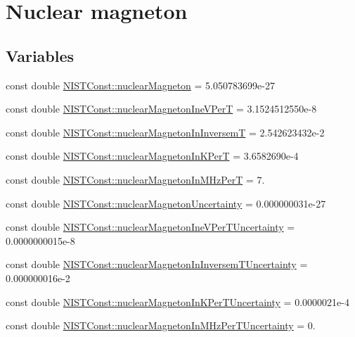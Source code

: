 \hypertarget{group___nuclear_magneton}{}\section{Nuclear magneton}
\label{group___nuclear_magneton}
\subsection*{Variables}
\begin{DoxyCompactItemize}
\item 
const double \hyperlink{group___nuclear_magneton_gacf9b0d2a2517113d30300e4ed7b56cc7}{N\+I\+S\+T\+Const\+::nuclear\+Magneton} = 5.\+050783699e-\/27
\item 
const double \hyperlink{group___nuclear_magneton_ga5a31a1865923a1c14cd7f22c8973186e}{N\+I\+S\+T\+Const\+::nuclear\+Magneton\+Ine\+V\+PerT} = 3.\+1524512550e-\/8
\item 
const double \hyperlink{group___nuclear_magneton_ga2bb8e56daaa602b5097d38b2d1ca32ad}{N\+I\+S\+T\+Const\+::nuclear\+Magneton\+In\+InversemT} = 2.\+542623432e-\/2
\item 
const double \hyperlink{group___nuclear_magneton_gac546d7a48ca06ce3231f7cda738bb4e3}{N\+I\+S\+T\+Const\+::nuclear\+Magneton\+In\+K\+PerT} = 3.\+6582690e-\/4
\item 
const double \hyperlink{group___nuclear_magneton_gae1ed12acbc3f50345ed451327b86b5b5}{N\+I\+S\+T\+Const\+::nuclear\+Magneton\+In\+M\+Hz\+PerT} = 7.
\item 
const double \hyperlink{group___nuclear_magneton_ga1f693f4e6c1d8f771594a847e185b072}{N\+I\+S\+T\+Const\+::nuclear\+Magneton\+Uncertainty} = 0.\+000000031e-\/27
\item 
const double \hyperlink{group___nuclear_magneton_gad4934d98a9f09cb4bae556e2aa11ff84}{N\+I\+S\+T\+Const\+::nuclear\+Magneton\+Ine\+V\+Per\+T\+Uncertainty} = 0.\+0000000015e-\/8
\item 
const double \hyperlink{group___nuclear_magneton_ga084f0bd27d89a4475362e8e2e0393bfa}{N\+I\+S\+T\+Const\+::nuclear\+Magneton\+In\+Inversem\+T\+Uncertainty} = 0.\+000000016e-\/2
\item 
const double \hyperlink{group___nuclear_magneton_gaf3f8996bdff7edd5515c4a91fe599509}{N\+I\+S\+T\+Const\+::nuclear\+Magneton\+In\+K\+Per\+T\+Uncertainty} = 0.\+0000021e-\/4
\item 
const double \hyperlink{group___nuclear_magneton_gafadaf7c2f76a76acf9313700c176b0a2}{N\+I\+S\+T\+Const\+::nuclear\+Magneton\+In\+M\+Hz\+Per\+T\+Uncertainty} = 0.

\end{DoxyCompactItemize}

